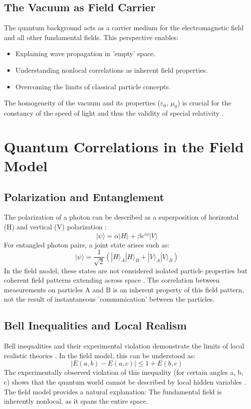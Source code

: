 \documentclass[12pt,a4paper]{article}
\begin{document}
	\subsection{The Vacuum as Field Carrier}
	The quantum background acts as a carrier medium for the electromagnetic field and all other fundamental fields. This perspective enables:
	\begin{itemize}
		\item Explaining wave propagation in 'empty' space.
		\item Understanding nonlocal correlations as inherent field properties.
		\item Overcoming the limits of classical particle concepts.
	\end{itemize}
	The homogeneity of the vacuum and its properties (\(\varepsilon_0\), \(\mu_0\)) is crucial for the constancy of the speed of light and thus the validity of special relativity \cite{Weinberg1995}\relax.
	
	\section{Quantum Correlations in the Field Model}
	\subsection{Polarization and Entanglement}
	The polarization of a photon can be described as a superposition of horizontal (H) and vertical (V) polarization \cite{Fox2006}\relax:
	\begin{equation}
		|\psi\rangle = \alpha |H\rangle + \beta e^{i\phi} |V\rangle
	\end{equation}
	For entangled photon pairs, a joint state arises such as:
	\begin{equation}
		|\psi\rangle = \frac{1}{\sqrt{2}} (|H\rangle_A |H\rangle_B + |V\rangle_A |V\rangle_B)
	\end{equation}
	In the field model, these states are not considered isolated particle properties but coherent field patterns extending across space \cite{Zeilinger2010}\relax. The correlation between measurements on particles A and B is an inherent property of this field pattern, not the result of instantaneous 'communication' between the particles.
	
	\subsection{Bell Inequalities and Local Realism}
	Bell inequalities and their experimental violation demonstrate the limits of local realistic theories \cite{Bell1964}\relax. In the field model, this can be understood as:
	\begin{equation}
		|E(a,b) - E(a,c)| \leq 1 + E(b,c)
	\end{equation}
	The experimentally observed violation of this inequality (for certain angles a, b, c) shows that the quantum world cannot be described by local hidden variables \cite{Aspect1982}\relax. The field model provides a natural explanation: The fundamental field is inherently nonlocal, as it spans the entire space.
	
\end{document}
